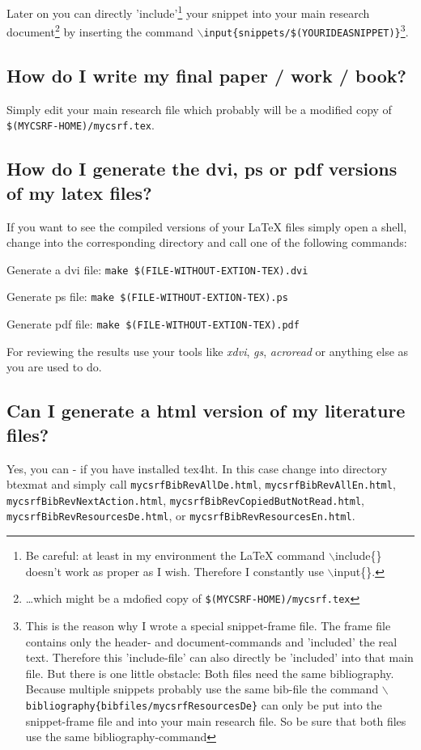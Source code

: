 \documentclass[DIV=calc,BCOR=5mm,11pt,headings=small,oneside,abstract=true, toc=bib]{scrartcl}
\begin{document}
Later on you can directly 'include'\footnote{Be careful: at least in my
environment the LaTeX command $\backslash$include\{\} doesn't work as proper as
I wish. Therefore I constantly use $\backslash$input\{\}.} your snippet into
your main research document\footnote{\ldots which might be a mdofied copy of
\texttt{\$(MYCSRF-HOME)/mycsrf.tex}} by inserting the command
\texttt{$\backslash$input\{snippets/\$(YOURIDEASNIPPET)\}}\footnote{This is the
reason why I wrote a special snippet-frame file. The frame file contains only
the header- and document-commands and 'included' the real text. Therefore this
'include-file' can also directly be 'included' into that main file. But there is
one little obstacle: Both files need the same bibliography. Because multiple
snippets probably use the same bib-file the command
\texttt{$\backslash$bibliography\{\-bibfiles/\-mycsrfResourcesDe\}} can only be
put into the snippet-frame file and into your main research file. So be sure
that both files use the same bibliography-command}.

\subsection{How do I write my final paper / work / book?}

Simply edit your main research file which probably will be a modified copy of
\texttt{\$(MYCSRF-HOME)/mycsrf.tex}. 

\subsection{How do I generate the dvi, ps or pdf versions of my latex files?}
If you want to see the compiled versions of your LaTeX files simply open a
shell, change into the corresponding directory and call one of the following
commands:

\begin{description} 
\item Generate a dvi file: \texttt{make \$(FILE-WITHOUT-EXTION-TEX).dvi}
\item Generate ps file: \texttt{make \$(FILE-WITHOUT-EXTION-TEX).ps} 
\item Generate pdf file: \texttt{make \$(FILE-WITHOUT-EXTION-TEX).pdf}
\end{description}

For reviewing the results use your tools like \textit{xdvi}, \textit{gs},
\textit{acroread} or anything else as you are used to do.

\subsection{Can I generate a html version of my literature files?}
Yes, you can - if you have installed tex4ht. In this case change into
directory btexmat and simply call \texttt{mycsrfBibRevAllDe.html}, 
\texttt{mycsrfBibRevAllEn.html}, \texttt{mycsrfBibRevNextAction.html},
\texttt{mycsrfBibRevCopiedButNotRead.html},
\texttt{mycsrfBibRevResourcesDe.html}, or
\texttt{mycsrfBibRevResourcesEn.html}.
\end{document}
